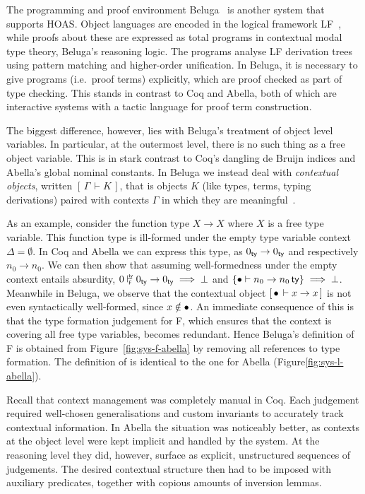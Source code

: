 \newcommand{\D}{\mathcal{D}}
\newcommand{\bc}[2]{\ensuremath{[\,#1\,\vdash #2\,]}}
\newcommand{\sof}{\ensuremath{\!:\ms}}
\newcommand{\ssep}{\ensuremath{,\ms}}

The programming and proof environment Beluga~\cite{Pientka:FLOPS10,Pientka:CADE15} is another system that supports HOAS.
Object languages are encoded in the logical framework LF~\cite{Harper93jacm}, while proofs about these are expressed as total programs in contextual modal type theory, Beluga's reasoning logic.
The programs analyse LF derivation trees using pattern matching and higher-order unification.
In Beluga, it is necessary to give programs (i.e.\ proof terms) explicitly, which are proof checked as part of type checking.
This stands in contrast to Coq and Abella, both of which are interactive systems with a tactic language for proof term construction.

\enlargethispage{\baselineskip}

The biggest difference, however, lies with Beluga's treatment of object level variables.
In particular, at the outermost level, there is no such thing as a free object variable.
This is in stark contrast to Coq's dangling de Bruijn indices and Abella's global nominal constants.
In Beluga we instead deal with \emph{contextual objects}, written $\bc{\Gamma}{K}$, that is objects $K$ (like types, terms, typing derivations) paired with contexts $\Gamma$ in which they are meaningful~\cite{Nanevski:ICML05,Pientka:POPL08}.

As an example, consider the function type $X \to X$ where $X$ is a free type variable.
This function type is ill-formed under the empty type variable context $\Delta = \emptyset$.
In Coq and Abella we can express this type, as $0_{\mathsf{ty}} \to 0_{\mathsf{ty}}$ and respectively $n_0 \to n_0$.
We can then show that assuming well-formedness under the empty context entails absurdity, $\istyF{0}{0_\ty \to 0_\ty} \implies \bot$ and $\{\bullet \vdash n_0 \to n_0\,\mathsf{ty}\} \implies \bot$.
Meanwhile in Beluga, we observe that the contextual object $\bc{\emptyctx}{x \to x}$ is not even syntactically well-formed, since $x \notin \bullet$.
An immediate consequence of this is that the type formation judgement for F, which ensures that the context is covering all free type variables, becomes redundant.
Hence Beluga's definition of F is obtained from Figure~\ref{fig:sys-f-abella} by removing all references to type formation.
The definition of \SysL is identical to the one for Abella (Figure\ref{fig:sys-l-abella}).

Recall that context management was completely manual in Coq.
Each judgement required well-chosen generalisations and custom invariants to accurately track contextual information.
In Abella the situation was noticeably better, as contexts at the object level were kept implicit and handled by the system.
At the reasoning level they did, however, surface as explicit, unstructured sequences of judgements.
The desired contextual structure then had to be imposed with auxiliary predicates, together with copious amounts of inversion lemmas.

